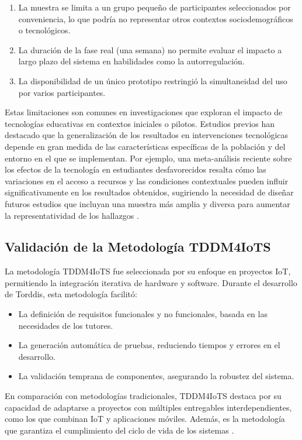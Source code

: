 \documentclass[a4paper,fleqn]{cas-sc}
\begin{document}
			\begin{enumerate}
				\item La muestra se limita a un grupo pequeño de participantes seleccionados por conveniencia, lo que podría no representar otros contextos sociodemográficos o tecnológicos.
				\item La duración de la fase real (una semana) no permite evaluar el impacto a largo plazo del sistema en habilidades como la autorregulación.
				\item La disponibilidad de un único prototipo restringió la simultaneidad del uso por varios participantes.
			\end{enumerate}
			
			Estas limitaciones son comunes en investigaciones que exploran el impacto de tecnologías educativas en contextos iniciales o pilotos. Estudios previos han destacado que la generalización de los resultados en intervenciones tecnológicas depende en gran medida de las características específicas de la población y del entorno en el que se implementan. Por ejemplo, una meta-análisis reciente sobre los efectos de la tecnología en estudiantes desfavorecidos resalta cómo las variaciones en el acceso a recursos y las condiciones contextuales pueden influir significativamente en los resultados obtenidos, sugiriendo la necesidad de diseñar futuros estudios que incluyan una muestra más amplia y diversa para aumentar la representatividad de los hallazgos \citep{DiPietro2025Meta}.
			
		\subsection{Validación de la Metodología TDDM4IoTS}
			La metodología TDDM4IoTS \citep{Guerrero-Ulloa2020TDDM4IoTS} fue seleccionada por su enfoque en proyectos IoT, permitiendo la integración iterativa de hardware y software. Durante el desarrollo de Torddis, esta metodología facilitó:
			
			\begin{itemize}
				\item La definición de requisitos funcionales y no funcionales, basada en las necesidades de los tutores.
				\item La generación automática de pruebas, reduciendo tiempos y errores en el desarrollo.
				\item La validación temprana de componentes, asegurando la robustez del sistema.
			\end{itemize}
			En comparación con metodologías tradicionales, TDDM4IoTS destaca por su capacidad de adaptarse a proyectos con múltiples entregables interdependientes, como los que combinan IoT y aplicaciones móviles. Además, es la metodología que garantiza el cumplimiento del ciclo de vida de los sistemas \citep{Guerrero2023Agile,ISO-IEC-IEEE12207-2017,ISO-IEC-IEEE12207-2017Application}.
			
\end{document}
